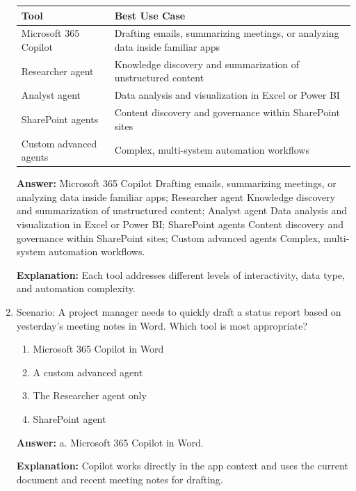 \documentclass[10pt]{article}
\begin{document}
\begin{enumerate}[leftmargin=*]
\begin{center}
\begin{tabular}{>{\raggedright\arraybackslash}p{} >{\raggedright\arraybackslash}p{}}
\toprule
\textbf{Tool} & \textbf{Best Use Case} \\
\midrule
Microsoft 365 Copilot & Drafting emails, summarizing meetings, or analyzing data inside familiar apps \\
Researcher agent & Knowledge discovery and summarization of unstructured content \\
Analyst agent & Data analysis and visualization in Excel or Power BI \\
SharePoint agents & Content discovery and governance within SharePoint sites \\
Custom advanced agents & Complex, multi-system automation workflows \\
\bottomrule
\end{tabular}
\end{center}

\textbf{Answer:} Microsoft 365 Copilot \textrightarrow{} Drafting emails, summarizing meetings, or analyzing data inside familiar apps; Researcher agent \textrightarrow{} Knowledge discovery and summarization of unstructured content; Analyst agent \textrightarrow{} Data analysis and visualization in Excel or Power BI; SharePoint agents \textrightarrow{} Content discovery and governance within SharePoint sites; Custom advanced agents \textrightarrow{} Complex, multi-system automation workflows.

\textbf{Explanation:} Each tool addresses different levels of interactivity, data type, and automation complexity.

\item Scenario: A project manager needs to quickly draft a status report based on yesterday’s meeting notes in Word. Which tool is most appropriate?
\begin{enumerate}[label=\alph*., leftmargin=1.5em]
\item Microsoft 365 Copilot in Word
\item A custom advanced agent
\item The Researcher agent only
\item SharePoint agent
\end{enumerate}
\textbf{Answer:} a. Microsoft 365 Copilot in Word.

\textbf{Explanation:} Copilot works directly in the app context and uses the current document and recent meeting notes for drafting.


\end{enumerate}
\end{document}
